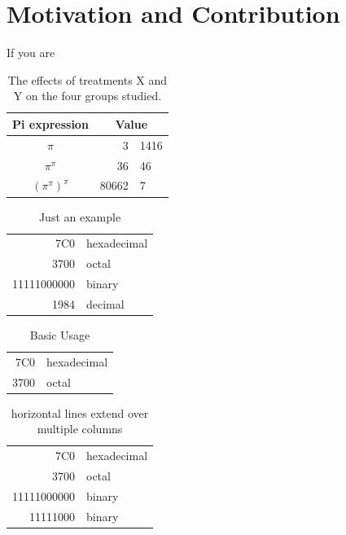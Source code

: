 \section{Motivation and Contribution}\label{sec:motivation_and_contribution}
If you are
\begin{table}
    \label{tab:treatments}
    \centering
    \begin{tabular}{c r @{.} l}
        Pi expression       &
        \multicolumn{2}{c}{Value} \\
        \hline
        $\pi$               & 3&1416  \\
        $\pi^{\pi}$         & 36&46   \\
        $(\pi^{\pi})^{\pi}$ & 80662&7 \\
    \end{tabular}
    \caption{The effects of treatments X and Y on the four groups studied.}
\end{table}

\begin{table}
    \label{tab:tabular_example1}
    \centering
    \begin{tabular}[t]{|r|l|}
        \hline
        7C0 & hexadecimal \\
        3700 & octal \\
        \cline{2-2} 11111000000 & binary \\
        \hline
        \hline
        1984 & decimal \\
        \hline
    \end{tabular}
\caption{Just an example}
\end{table}

\begin{table}
    \label{tab:tabular_example2}
    \centering
    \begin{tabular}{|r|l|}
        \hline
        7C0 & hexadecimal \\
        3700 & octal \\
        \hline
    \end{tabular}
\caption{Basic Usage}
\end{table}

\begin{table}
    \label{tab:tabular_example3}
    \centering
    \begin{tabular}{|r|l|}
        \hline
        7C0 & hexadecimal \\
        \cline{1-2}
        3700 & octal \\
        \cline{2-2}
        11111000000 & binary \\
        \cline{1-2}
        11111000 & binary \\
        \hline
    \end{tabular}
\caption{horizontal lines extend over multiple columns}
\end{table}

